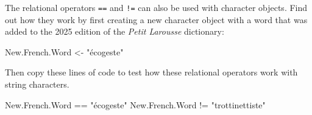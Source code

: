 \documentclass[
  letterpaper,
  DIV=11,
  numbers=noendperiod,
  oneside]{scrreprt}
\newenvironment{Shaded}{\begin{snugshade}}{\end{snugshade}}
\newcommand{\NormalTok}[1]{\textcolor[rgb]{0.00,0.23,0.31}{#1}}
\newcommand{\OtherTok}[1]{\textcolor[rgb]{0.00,0.23,0.31}{#1}}
\newcommand{\SpecialCharTok}[1]{\textcolor[rgb]{0.37,0.37,0.37}{#1}}
\newcommand{\StringTok}[1]{\textcolor[rgb]{0.13,0.47,0.30}{#1}}
\begin{document}
The relational operators \texttt{==} and \texttt{!=} can also be used
with character objects. Find out how they work by first creating a new
character object with a word that was added to the 2025 edition of the
\emph{Petit Larousse} dictionary:

\begin{Shaded}
\begin{Highlighting}[]
\NormalTok{New.French.Word }\OtherTok{\textless{}{-}} \StringTok{"écogeste"}
\end{Highlighting}
\end{Shaded}

Then copy these lines of code to test how these relational operators
work with string characters.

\begin{Shaded}
\begin{Highlighting}[]
\NormalTok{New.French.Word }\SpecialCharTok{==} \StringTok{"écogeste"} 
\NormalTok{New.French.Word }\SpecialCharTok{!=} \StringTok{"trottinettiste"}
\end{Highlighting}
\end{Shaded}
\end{document}
